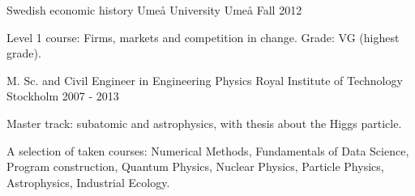 


\begin{cventries}
\cventry
{Swedish economic history} %
{Ume{\aa} University} %
{Ume{\aa}} %
{Fall 2012} %
{ %
\begin{cvitems}
\item {Level 1 course: Firms, markets and competition in change. Grade: VG (highest grade).
}
\end{cvitems}
}


\cventry
{M. Sc. and Civil Engineer in Engineering Physics} %
{Royal Institute of Technology} %
{Stockholm} %
{2007 - 2013} %
{ %
\begin{cvitems}
\item {Master track: subatomic and astrophysics, with thesis about the Higgs particle.}
\item {A selection of taken courses: Numerical Methods, Fundamentals of Data Science, Program construction, Quantum Physics, Nuclear Physics, Particle Physics, Astrophysics, Industrial Ecology. %
}
\end{cvitems}
}



\end{cventries}